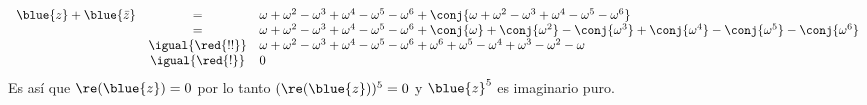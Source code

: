 \begin{enumerate}[label=(\alph*)]
$$\begin{array}{rcl}
            \blue{z} + \blue{\bar{z}}
             & =                &
            \omega + \omega^2 - \omega^3 + \omega^4 - \omega^5 - \omega^6 + \conj{\omega + \omega^2 - \omega^3 + \omega^4 - \omega^5 - \omega^6}                                    \\
             & =                &
            \omega + \omega^2 - \omega^3 + \omega^4 - \omega^5 - \omega^6 + \conj{\omega} + \conj{\omega^2} - \conj{\omega^3} + \conj{\omega^4} - \conj{\omega^5} - \conj{\omega^6} \\
             & \igual{\red{!!}} &
            \omega + \omega^2 - \omega^3 + \omega^4 - \omega^5 - \omega^6 + \omega^6 + \omega^5 - \omega^4 + \omega^3 - \omega^2 - \omega                                           \\
             & \igual{\red{!}}  &
            0
          \end{array}
        $$
        Es así que $\re(\blue{z}) = 0$ por lo tanto $(\re(\blue{z}))^5 = 0$ y $\blue{z}^5$ es imaginario puro.


\end{enumerate}
